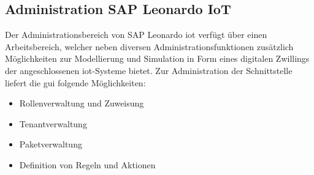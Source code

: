 \subsection{Administration SAP Leonardo IoT}
\label{ss:interface:admin}

\noindent Der Administrationsbereich von SAP Leonardo \ac{iot} verfügt über einen Arbeitsbereich, welcher neben diversen Administrationsfunktionen zusätzlich Möglichkeiten zur Modellierung und Simulation in Form eines digitalen Zwillings der angeschlossenen \ac{iot}-Systeme bietet. Zur Administration der Schnittstelle liefert die \ac{gui} folgende Möglichkeiten:
\begin{itemize}
	\setlength{\itemsep}{1pt}
	\item{Rollenverwaltung und Zuweisung}
	\item{Tenantverwaltung}
	\item{Paketverwaltung}
	\item{Definition von Regeln und Aktionen}
\end{itemize}

